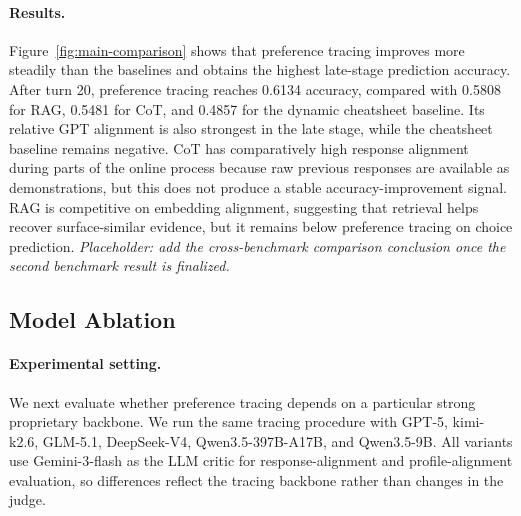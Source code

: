 \paragraph{Results.}
Figure~\ref{fig:main-comparison} shows that preference tracing improves more steadily than
the baselines and obtains the highest late-stage prediction accuracy. After turn 20,
preference tracing reaches 0.6134 accuracy, compared with 0.5808 for RAG, 0.5481 for CoT,
and 0.4857 for the dynamic cheatsheet baseline. Its relative GPT alignment is also strongest
in the late stage, while the cheatsheet baseline remains negative. CoT has comparatively high
response alignment during parts of the online process because raw previous responses are
available as demonstrations, but this does not produce a stable accuracy-improvement signal.
RAG is competitive on embedding alignment, suggesting that retrieval helps recover
surface-similar evidence, but it remains below preference tracing on choice prediction.
\emph{Placeholder: add the cross-benchmark comparison conclusion once the second benchmark
result is finalized.}

\subsection{Model Ablation}

\paragraph{Experimental setting.}
We next evaluate whether preference tracing depends on a particular strong proprietary
backbone. We run the same tracing procedure with GPT-5, kimi-k2.6, GLM-5.1, DeepSeek-V4,
Qwen3.5-397B-A17B, and Qwen3.5-9B. All variants use Gemini-3-flash as the LLM critic for
response-alignment and profile-alignment evaluation, so differences reflect the tracing
backbone rather than changes in the judge.

